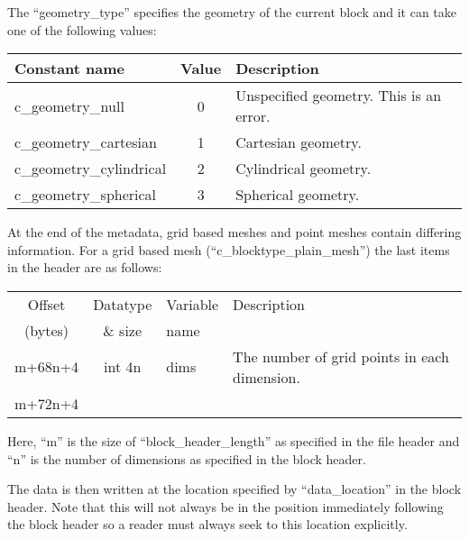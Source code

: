 \documentclass[12pt]{article}
\begin{document}
The ``geometry\_type'' specifies the geometry of the current block and it can
take one of the following values:\\

\begin{center}
\begin{tabularx}{0.9\textwidth}[!hbt]{lcX}
  Constant name & Value & Description
  \\\toprule

  c\_geometry\_null & 0 & Unspecified geometry. This is an error.
  \\\midrule

  c\_geometry\_cartesian & 1 & Cartesian geometry.
  \\\midrule

  c\_geometry\_cylindrical & 2 & Cylindrical geometry.
  \\\midrule

  c\_geometry\_spherical & 3 & Spherical geometry.
\end{tabularx}
\end{center}\vspace{10pt}

At the end of the metadata, grid based meshes and point meshes contain
differing information. For a grid based mesh (``c\_blocktype\_plain\_mesh'')
the last items in the header are as follows:\\

\begin{center}
\begin{tabularx}{0.9\textwidth}[!hbt]{cclX}
  Offset & Datatype & Variable & Description\\
  (bytes) & \& size & name &
  \\\toprule

  m+68n+4 & int 4n & dims & The number of grid points in each dimension.
  \\\midrule

  m+72n+4 &
\end{tabularx}
\end{center}\vspace{10pt}

Here, ``m'' is the size of ``block\_header\_length'' as specified in the file
header and ``n'' is the number of dimensions as specified in the block header.

The data is then written at the location specified by ``data\_location'' in
the block header. Note that this will not always be in the position immediately
following the block header so a reader must always seek to this location
explicitly.
\end{document}
